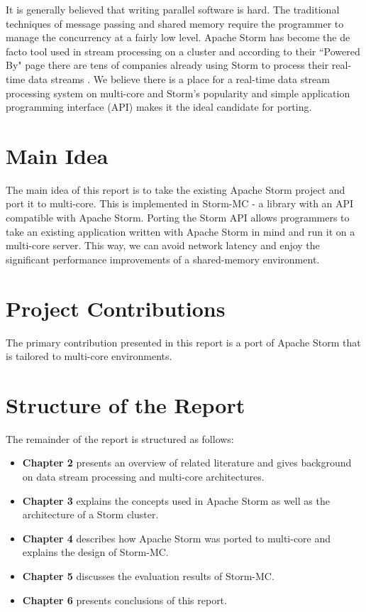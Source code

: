 It is generally believed that writing parallel software is hard. The traditional techniques of message passing and shared memory require the programmer to manage the concurrency at a fairly low level. Apache Storm has become the de facto tool used in stream processing on a cluster and according to their ``Powered By" page there are tens of companies already using Storm to process their real-time data streams \cite{PoweredBy}. We believe there is a place for a real-time data stream processing system on multi-core and Storm's popularity and simple application programming interface (API) makes it the ideal candidate for porting.

\section{Main Idea}

The main idea of this report is to take the existing Apache Storm project and port it to multi-core. This is implemented in Storm-MC - a library with an API compatible with Apache Storm. Porting the Storm API allows programmers to take an existing application written with Apache Storm in mind and run it on a multi-core server. This way, we can avoid network latency and enjoy the significant performance improvements of a shared-memory environment.

\section{Project Contributions}

The primary contribution presented in this report is a port of Apache Storm that is tailored to multi-core environments.

\section{Structure of the Report}

The remainder of the report is structured as follows:

\begin{itemize}
	\item \textbf{Chapter 2} presents an overview of related literature and gives background on data stream processing and multi-core architectures.
	\item \textbf{Chapter 3} explains the concepts used in Apache Storm as well as the architecture of a Storm cluster.
	\item \textbf{Chapter 4} describes how Apache Storm was ported to multi-core and explains the design of Storm-MC.
	\item \textbf{Chapter 5} discusses the evaluation results of Storm-MC.
	\item \textbf{Chapter 6} presents conclusions of this report.
\end{itemize}
